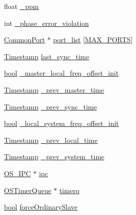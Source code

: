 \begin{DoxyCompactItemize}
\item 
float \hyperlink{class_i_e_e_e1588_clock_ae061efd6b04ce63dbc4c48b9bb1d3002}{\+\_\+ppm}
\item 
int \hyperlink{class_i_e_e_e1588_clock_a25a69327f1634dd59c4bee36a4d3007b}{\+\_\+phase\+\_\+error\+\_\+violation}
\item 
\hyperlink{class_common_port}{Common\+Port} $\ast$ \hyperlink{class_i_e_e_e1588_clock_a47de36fc664f1b0c667d75d1c1639589}{port\+\_\+list} \mbox{[}\hyperlink{ieee1588_8hpp_a40ad70cc6e2125af9340a4bc26a83764}{M\+A\+X\+\_\+\+P\+O\+R\+TS}\mbox{]}
\item 
\hyperlink{class_timestamp}{Timestamp} \hyperlink{class_i_e_e_e1588_clock_a19383c316c2d87c58ea541a65ec3acdf}{last\+\_\+sync\+\_\+time}
\item 
\hyperlink{avb__gptp_8h_af6a258d8f3ee5206d682d799316314b1}{bool} \hyperlink{class_i_e_e_e1588_clock_abca95b219ee50066ce65ca36310c3aa3}{\+\_\+master\+\_\+local\+\_\+freq\+\_\+offset\+\_\+init}
\item 
\hyperlink{class_timestamp}{Timestamp} \hyperlink{class_i_e_e_e1588_clock_a63a3a60d4d184a1255e92d9c881ba81b}{\+\_\+prev\+\_\+master\+\_\+time}
\item 
\hyperlink{class_timestamp}{Timestamp} \hyperlink{class_i_e_e_e1588_clock_af8fc87788a60f7d64b3172beb18e3b45}{\+\_\+prev\+\_\+sync\+\_\+time}
\item 
\hyperlink{avb__gptp_8h_af6a258d8f3ee5206d682d799316314b1}{bool} \hyperlink{class_i_e_e_e1588_clock_a2fc199ad709f7a96543b241f8e4f12a8}{\+\_\+local\+\_\+system\+\_\+freq\+\_\+offset\+\_\+init}
\item 
\hyperlink{class_timestamp}{Timestamp} \hyperlink{class_i_e_e_e1588_clock_a6f5e345b7156222b4c38108c4e98823f}{\+\_\+prev\+\_\+local\+\_\+time}
\item 
\hyperlink{class_timestamp}{Timestamp} \hyperlink{class_i_e_e_e1588_clock_a41e7bda38ca1214821d6ebf5164aea96}{\+\_\+prev\+\_\+system\+\_\+time}
\item 
\hyperlink{class_o_s___i_p_c}{O\+S\+\_\+\+I\+PC} $\ast$ \hyperlink{class_i_e_e_e1588_clock_afe51478e6c657301658268066e29b31f}{ipc}
\item 
\hyperlink{class_o_s_timer_queue}{O\+S\+Timer\+Queue} $\ast$ \hyperlink{class_i_e_e_e1588_clock_a1e7ff34593ba8567fd2b6bbd988db63e}{timerq}
\item 
\hyperlink{avb__gptp_8h_af6a258d8f3ee5206d682d799316314b1}{bool} \hyperlink{class_i_e_e_e1588_clock_ae0c175aedaecf0e5d9b536e6f4f9dbab}{force\+Ordinary\+Slave}
\item 

\end{DoxyCompactItemize}
